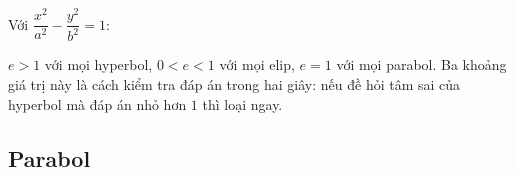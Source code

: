 \documentclass[11pt, a4paper]{article}
\begin{document}
\begin{dinhly}
Với $\dfrac{x^2}{a^2} - \dfrac{y^2}{b^2} = 1$:


 $e > 1$ với mọi hyperbol, $0 < e < 1$ với mọi elip, $e = 1$ với mọi parabol. Ba khoảng giá trị này là cách kiểm tra đáp án trong hai giây: nếu đề hỏi tâm sai của hyperbol mà đáp án nhỏ hơn $1$ thì loại ngay.
\end{dinhly}
\subsection{Parabol}
\end{document}
